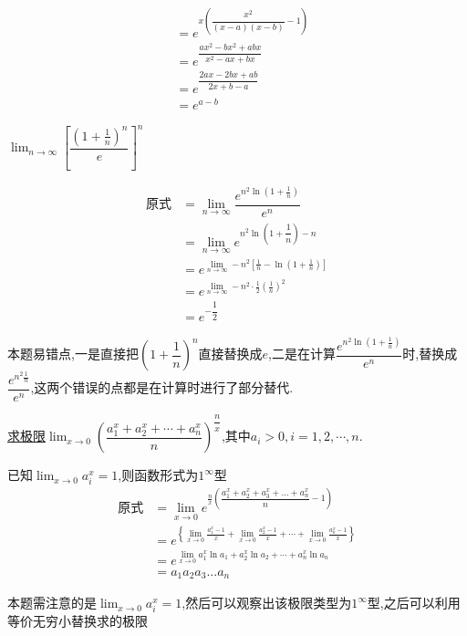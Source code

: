 \documentclass[8pt a4paper, oneside, UTF8]{ctexbook}
\begin{document}
\begin{sloppypar}
\begin{solution}
\begin{align*}
                      & =e^{x \left(\dfrac{x^2}{(x-a)(x-b)}-1\right)}   \\
                      & = e^{\dfrac{ax^2-bx^2+abx}{x^2-ax+bx}}          \\
                      & = e^{\dfrac{2ax-2bx+ab}{2x+b-a}}                \\
                      & = e^{a-b}
        \end{align*}
    \end{solution}
    \begin{problem}
    $\lim_{n\to\infty}\left[\dfrac{\left(1+\frac1n\right)^n}e\right]^n$
    \end{problem}
    \begin{solution}
        \begin{align*}
            \text{原式} & = \lim_{n\to \infty} \dfrac{e^{n^2\ln(1+\frac{1}{n})}}{e^n}      \\
                      & = \lim_{n\to \infty} e^{n^2\ln(1+\dfrac{1}{n})-n}                \\
                      & = e^{\lim_{n\to\infty}-n^2{\left[\frac1n-\ln(1+\frac1n)\right]}} \\
                      & = e^{\lim_{n\to\infty}-n^2\cdot\frac12(\frac1n)^2}               \\
                      & =e^{-\dfrac{1}{2}}
        \end{align*}
    \end{solution}
    \begin{note}
        本题易错点,一是直接把$(1+\dfrac{1}{n})^n$直接替换成$e$,二是在计算$\dfrac{e^{n^2\ln(1+\frac{1}{n})}}{e^n}$时,替换成$\dfrac{e^{n^2\frac{1}{n}}}{e^n}$,这两个错误的点都是在计算时进行了部分替代.
    \end{note}
    \begin{problem}
    \uline{求极限}$\lim_{x\to0}\left(\dfrac{a_1 ^x+a_2^x+\cdots+a_n^x}n\right)^{\dfrac nx}$,其中$a_i>0,i=1,2,\cdots,n.$
    \end{problem}
    \begin{solution}
        已知$\lim_{x\to 0} a_i^x = 1$,则函数形式为$1^{\infty}$型
        \begin{align*}
            \text{原式} & = \lim_{x\to 0} e^{\frac{n}{x}(\dfrac{a_1^x+a_2^x+a_3^x+...+a_n^x}{n}-1)}                                                         \\
                      & = e^{\left\{\lim_{x\to0}\frac{a_{1}^{x}-1}{x}+\lim_{x\to0}\frac{a_{2}^{x}-1}{x}+\cdots+\lim_{x\to0}\frac{a_{n}^{x}-1}{x}\right\}} \\
                      & = e^{\lim_{x\to0}a_{1}^{x}\ln a_{1}+a_{2}^{x}\ln a_{2}+\cdots+a_{n}^{x}\ln a_{n}}                                                 \\
                      & = a_1 a_2 a_3 ... a_n
        \end{align*}
    \end{solution}
    \begin{note}
        本题需注意的是$\lim_{x\to 0} a_i^x = 1$,然后可以观察出该极限类型为$1^{\infty}$型,之后可以利用等价无穷小替换求的极限
    \end{note}

\end{sloppypar}
\end{document}
